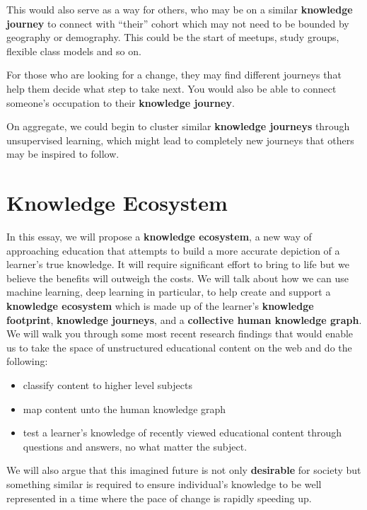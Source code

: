 \documentclass[]{book}
\theoremstyle{definition}
\theoremstyle{definition}
\theoremstyle{definition}
\theoremstyle{remark}
\begin{document}
This would also serve as a way for others, who may be on a similar
\textbf{knowledge journey} to connect with ``their'' cohort which may
not need to be bounded by geography or demography. This could be the
start of meetups, study groups, flexible class models and so on.

For those who are looking for a change, they may find different journeys
that help them decide what step to take next. You would also be able to
connect someone's occupation to their \textbf{knowledge journey}.

On aggregate, we could begin to cluster similar \textbf{knowledge
journeys} through unsupervised learning, which might lead to completely
new journeys that others may be inspired to follow.

\section{Knowledge Ecosystem}\label{knowledge-ecosystem}

In this essay, we will propose a \textbf{knowledge ecosystem}, a new way
of approaching education that attempts to build a more accurate
depiction of a learner's true knowledge. It will require significant
effort to bring to life but we believe the benefits will outweigh the
costs. We will talk about how we can use machine learning, deep learning
in particular, to help create and support a \textbf{knowledge ecosystem}
which is made up of the learner's \textbf{knowledge footprint},
\textbf{knowledge journeys}, and a \textbf{collective human knowledge
graph}. We will walk you through some most recent research findings that
would enable us to take the space of unstructured educational content on
the web and do the following:

\begin{itemize}
\item
  classify content to higher level subjects
\item
  map content unto the human knowledge graph
\item
  test a learner's knowledge of recently viewed educational content
  through questions and answers, no what matter the subject.
\end{itemize}

We will also argue that this imagined future is not only
\textbf{desirable} for society but something similar is required to
ensure individual's knowledge to be well represented in a time where the
pace of change is rapidly speeding up.
\end{document}
